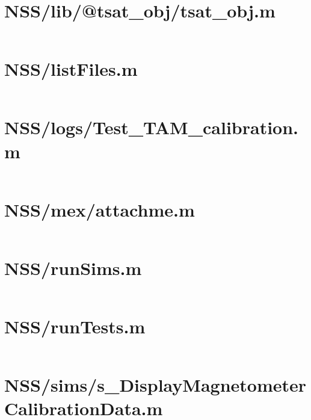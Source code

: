 \pagebreak
\section*{NSS/lib/@tsat\_obj/tsat\_obj.m}\label{code:NSS/lib/@tsat_obj/tsat_obj.m}
\inputminted[linenos,fontsize=\scriptsize]{matlab}{/home/dcouture/git/mathyourlife/TSatPy/beta_versions/matlab_object_oriented/lib/@tsat_obj/tsat_obj.m}

\pagebreak
\section*{NSS/listFiles.m}\label{code:NSS/listFiles.m}
\inputminted[linenos,fontsize=\scriptsize]{matlab}{/home/dcouture/git/mathyourlife/TSatPy/beta_versions/matlab_object_oriented/listFiles.m}

\pagebreak
\section*{NSS/logs/Test\_TAM\_calibration.m}\label{code:NSS/logs/Test_TAM_calibration.m}
\inputminted[linenos,fontsize=\scriptsize]{matlab}{/home/dcouture/git/mathyourlife/TSatPy/beta_versions/matlab_object_oriented/logs/Test_TAM_calibration.m}

\pagebreak
\section*{NSS/mex/attachme.m}\label{code:NSS/mex/attachme.m}
\inputminted[linenos,fontsize=\scriptsize]{matlab}{/home/dcouture/git/mathyourlife/TSatPy/beta_versions/matlab_object_oriented/mex/attachme.m}

\pagebreak
\section*{NSS/runSims.m}\label{code:NSS/runSims.m}
\inputminted[linenos,fontsize=\scriptsize]{matlab}{/home/dcouture/git/mathyourlife/TSatPy/beta_versions/matlab_object_oriented/runSims.m}

\pagebreak
\section*{NSS/runTests.m}\label{code:NSS/runTests.m}
\inputminted[linenos,fontsize=\scriptsize]{matlab}{/home/dcouture/git/mathyourlife/TSatPy/beta_versions/matlab_object_oriented/runTests.m}

\pagebreak
\section*{NSS/sims/s\_DisplayMagnetometerCalibrationData.m}\label{code:NSS/sims/s_DisplayMagnetometerCalibrationData.m}
\inputminted[linenos,fontsize=\scriptsize]{matlab}{/home/dcouture/git/mathyourlife/TSatPy/beta_versions/matlab_object_oriented/sims/s_DisplayMagnetometerCalibrationData.m}

